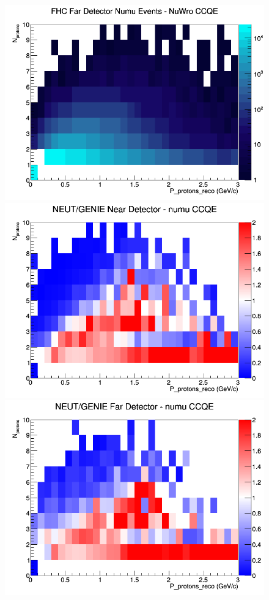 \begin{figure}[h]
\endminipage
{}
\includegraphics[width=\linewidth]{eff_N_P/GAr/protons/CCQE_FHC_FD_numu_N_P_NuWro.png}
\endminipage
\newline
{}
\includegraphics[width=\linewidth]{eff_N_P/GAr/protons/ratios/CCQE_NEUT_GENIE_numu_near_N_P.png}
\endminipage
{}
\includegraphics[width=\linewidth]{eff_N_P/GAr/protons/ratios/CCQE_NEUT_GENIE_numu_far_N_P.png}

\end{figure}
